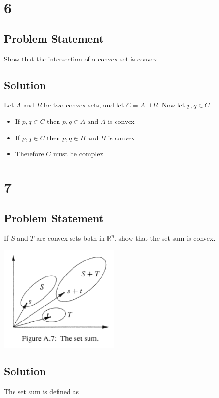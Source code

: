 \documentclass[11pt,a4paper,final]{article}
\begin{document}
\section{6}
\label{sec:org60e5cfd}
\subsection{Problem Statement}
\label{sec:orge087fd5}
Show that the intersection of a convex set is convex.

\subsection{Solution}
\label{sec:org01dbe53}
Let \(A\) and \(B\) be two convex sets, and let \(C = A \cup B\). Now let \(p,q \in C\).

\begin{itemize}
\item If \(p,q \in C\) then \(p,q \in A\) and \(A\) is convex
\item If \(p,q \in C\) then \(p,q \in B\) and \(B\) is convex
\item Therefore \(C\) must be complex
\end{itemize}

\section{7}
\label{sec:org5f6827c}
\subsection{Problem Statement}
\label{sec:org67a899e}
If \(S\) and \(T\) are convex sets both in \(\mathbb{R}^n\), show that the set sum is convex.

\begin{center}
\includegraphics[width=0.45\textwidth]{./img/set-sum.png}
\end{center}

\subsection{Solution}
\label{sec:orgeb367c2}
The set sum is defined as
\end{document}
